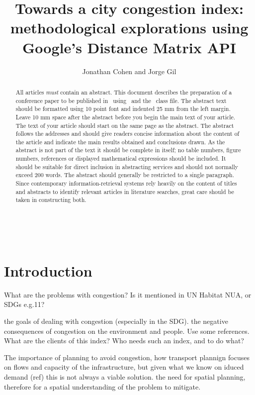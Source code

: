 \documentclass[a4paper]{jpconf}
\begin{document}
\title{Towards a city congestion index: methodological explorations using Google's Distance Matrix API}

\author{Jonathan Cohen and Jorge Gil}

\address{Chalmers University of Technology, Sven Hultins gata 6, SE-412 96, Göteborg, Sweden}





\begin{abstract}
	All articles {\it must} contain an abstract. This document describes the  preparation of a conference paper to be published in \jpcs\ using \LaTeXe\ and the \cls\ class file. The abstract text should be formatted using 10 point font and indented 25 mm from the left margin. Leave 10 mm space after the abstract before you begin the main text of your article. The text of your article should start on the same page as the abstract. The abstract follows the addresses and should give readers concise information about the content of the article and indicate the main results obtained and conclusions drawn. As the abstract is not part of the text it should be complete in itself; no table numbers, figure numbers, references or displayed mathematical expressions should be included. It should be suitable for direct inclusion in abstracting services and should not normally exceed 200 words. The abstract should generally be restricted to a single paragraph. Since contemporary information-retrieval systems rely heavily on the content of titles and abstracts to identify relevant articles in literature searches, great care should be taken in constructing both.
\end{abstract}

\

\section{Introduction}
\indent What are the problems with congestion? Is it mentioned in UN Habitat NUA, or SDGs e.g.11?\par
the goals of dealing with congestion (especially in the SDG). the negative consequences of congestion on the environment and people. Use some references.
\indent What are the clients of this index? Who needs such an index, and to do what?\par
The importance of planning to avoid congestion, how transport plannign focuses on flows and capacity of the infrastructure, but given what we know on iduced demand (ref) this is not always a viable solution. the need for spatial planning, therefore for a spatial understanding of the problem to mitigate.
\end{document}
